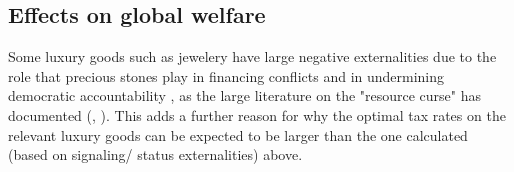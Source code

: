 \documentclass[../../main]{subfiles}
\begin{document}

\subsection{Effects on global welfare }

Some luxury goods such as jewelery have large negative externalities due to the role that precious stones play in financing conflicts \citet{binzel2023diamond} and in undermining democratic accountability \citet{bhattacharyya2010natural}, as the large literature on the "resource curse" has documented (\citet{olsson2007conflict}, \citet{blair2021commodity}). This adds a further reason for why the optimal tax rates on the relevant luxury goods can be expected to be larger than the one calculated (based on signaling/ status externalities) above.
\end{document}
